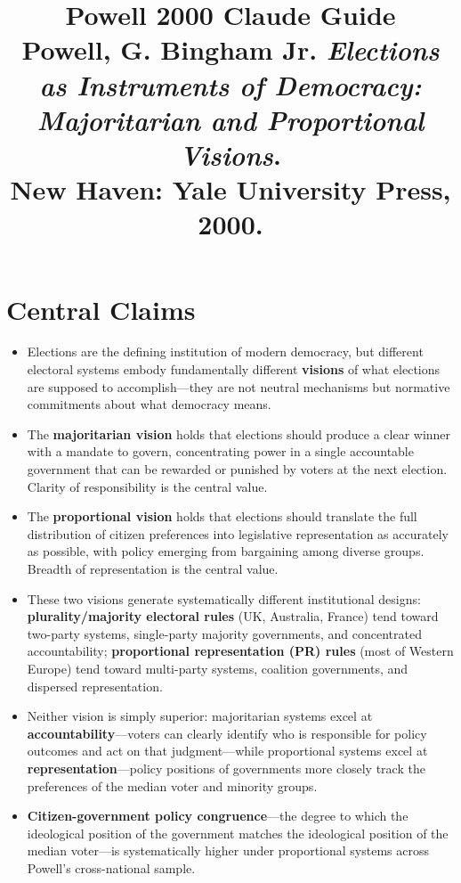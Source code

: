 \documentclass[12pt]{article}
\title{\textbf{Powell 2000 Claude Guide}\\
\large Powell, G. Bingham Jr. \textit{Elections as Instruments of Democracy: Majoritarian and Proportional Visions}.\\
New Haven: Yale University Press, 2000.}
\author{}
\date{}
\begin{document}
\maketitle
\tableofcontents
\newpage

\section{Central Claims}

\begin{itemize}[leftmargin=*, itemsep=4pt]
    \item Elections are the defining institution of modern democracy, but different electoral systems embody fundamentally different \textbf{visions} of what elections are supposed to accomplish---they are not neutral mechanisms but normative commitments about what democracy means.
    \item The \textbf{majoritarian vision} holds that elections should produce a clear winner with a mandate to govern, concentrating power in a single accountable government that can be rewarded or punished by voters at the next election. Clarity of responsibility is the central value.
    \item The \textbf{proportional vision} holds that elections should translate the full distribution of citizen preferences into legislative representation as accurately as possible, with policy emerging from bargaining among diverse groups. Breadth of representation is the central value.
    \item These two visions generate systematically different institutional designs: \textbf{plurality/majority electoral rules} (UK, Australia, France) tend toward two-party systems, single-party majority governments, and concentrated accountability; \textbf{proportional representation (PR) rules} (most of Western Europe) tend toward multi-party systems, coalition governments, and dispersed representation.
    \item Neither vision is simply superior: majoritarian systems excel at \textbf{accountability}---voters can clearly identify who is responsible for policy outcomes and act on that judgment---while proportional systems excel at \textbf{representation}---policy positions of governments more closely track the preferences of the median voter and minority groups.
    \item \textbf{Citizen-government policy congruence}---the degree to which the ideological position of the government matches the ideological position of the median voter---is systematically higher under proportional systems across Powell's cross-national sample.

\end{itemize}
\end{document}
